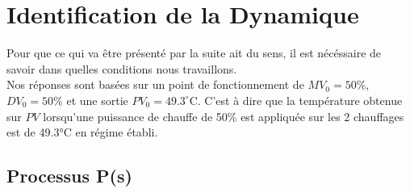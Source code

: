 \section{Identification de la Dynamique}

Pour que ce qui va être présenté par la suite ait du sens, il est nécéssaire de savoir dans quelles conditions nous travaillons.\\
Nos réponses sont basées sur un point de fonctionnement de $MV_0 = 50\%$, $DV_0 = 50\%$ et une sortie $PV_0 = 49.3^{\circ}$C. 
C'est à dire que la température obtenue sur $PV$ lorsqu'une puissance de chauffe de 50\% est appliquée sur les 2 chauffages est de 49.3°C en régime établi.

\subsection{Processus P(s)}

